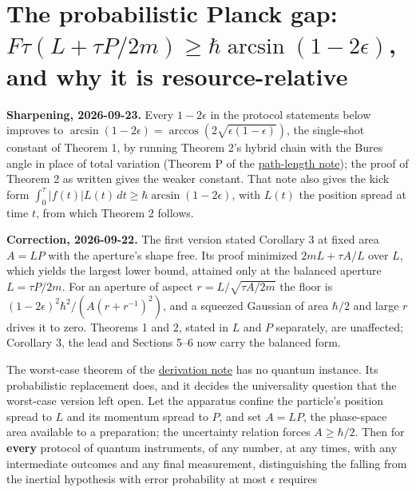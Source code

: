 \documentclass[11pt,a4paper]{article}
\begin{document}
\hypertarget{the-probabilistic-planck-gap-ftaultau-p2mgehbararcsin1-2epsilon-and-why-it-is-resource-relative}{%
\section{\texorpdfstring{The probabilistic Planck gap:
\(F\tau(L+\tau P/2m)\ge\hbar\arcsin(1-2\epsilon)\), and why it is
resource-relative}{The probabilistic Planck gap: F\textbackslash tau(L+\textbackslash tau P/2m)\textbackslash ge\textbackslash hbar\textbackslash arcsin(1-2\textbackslash epsilon), and why it is resource-relative}}\label{the-probabilistic-planck-gap-ftaultau-p2mgehbararcsin1-2epsilon-and-why-it-is-resource-relative}}

\textbf{Sharpening, 2026-09-23.} Every \(1-2\epsilon\) in the protocol
statements below improves to
\(\arcsin(1-2\epsilon)=\arccos(2\sqrt{\epsilon(1-\epsilon)})\), the
single-shot constant of Theorem 1, by running Theorem 2's hybrid chain
with the Bures angle in place of total variation (Theorem P of the
\href{record-distance-path-length.md}{path-length note}); the proof of
Theorem 2 as written gives the weaker constant. That note also gives the
kick form \(\int_0^\tau|f(t)|L(t)\,dt\ge\hbar\arcsin(1-2\epsilon)\),
with \(L(t)\) the position spread at time \(t\), from which Theorem 2
follows.

\textbf{Correction, 2026-09-22.} The first version stated Corollary 3 at
fixed area \(A=LP\) with the aperture's shape free. Its proof minimized
\(2mL+\tau A/L\) over \(L\), which yields the largest lower bound,
attained only at the balanced aperture \(L=\tau P/2m\). For an aperture
of aspect \(r=L/\sqrt{\tau A/2m}\) the floor is
\((1-2\epsilon)^2\hbar^2/(A(r+r^{-1})^2)\), and a squeezed Gaussian of
area \(\hbar/2\) and large \(r\) drives it to zero. Theorems 1 and 2,
stated in \(L\) and \(P\) separately, are unaffected; Corollary 3, the
lead and Sections 5--6 now carry the balanced form.

The worst-case theorem of the \href{planck-gap-derivation.md}{derivation
note} has no quantum instance. Its probabilistic replacement does, and
it decides the universality question that the worst-case version left
open. Let the apparatus confine the particle's position spread to \(L\)
and its momentum spread to \(P\), and set \(A=LP\), the phase-space area
available to a preparation; the uncertainty relation forces
\(A\ge\hbar/2\). Then for \textbf{every} protocol of quantum
instruments, of any number, at any times, with any intermediate outcomes
and any final measurement, distinguishing the falling from the inertial
hypothesis with error probability at most \(\epsilon\) requires
\end{document}
